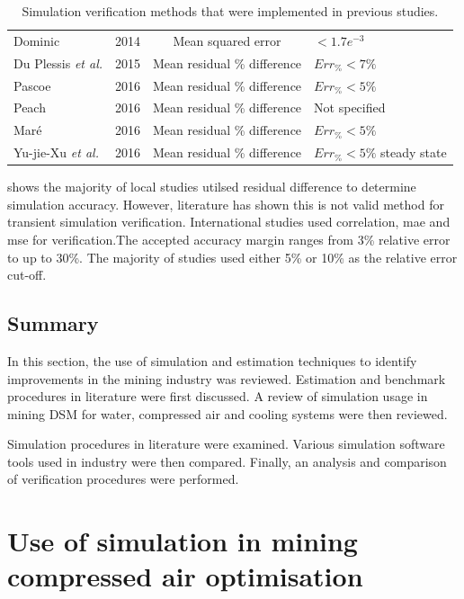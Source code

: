 \begin{table}[h]
\begin{tabular}{p{5cm}ccl}
 			Dominic \cite{dominic2014dynamic}					& 2014 & Mean squared error & $<1.7e^{-3}$	\\
 			Du Plessis \textit{et al.}\cite{du2015development} 	& 2015 & Mean residual \% difference & $Err_{\%} <7\%$ \\
 			Pascoe \cite{Pascoe2016Masters} 					& 2016 & Mean residual \% difference & $Err_{\%} <5\%$ \\	
			Peach \cite{Peach2016Masters}						& 2016 & Mean residual \% difference & Not specified\\
 			Maré \cite{Mare2016PhD} 							& 2016 & Mean residual \% difference & $Err_{\%} <5\%$  \\	
 			Yu-jie-Xu \textit{et al.} \cite{xu2016modeling}		& 2016 & Mean residual \% difference & $Err_{\%} <5\%$ steady state \\
 			\hline
 		\end{tabular} 
 		\caption{Simulation verification methods that were implemented in previous studies.}
 		\label{table: Verification studies}
 	\end{table}
 
  shows the majority of local studies utilsed residual difference to determine simulation accuracy. However, literature has shown this is not valid method for transient simulation verification. International studies used correlation, \gls{mae} and \gls{mse} for verification.The accepted accuracy margin ranges from 3\% relative error to  up to 30\%. The majority of studies used either 5\% or 10\%  as the relative error cut-off.
 	\subsection{Summary}
 	In this section, the use of simulation and estimation techniques to identify improvements in the mining industry was reviewed. Estimation and benchmark procedures in literature were first discussed. A review of simulation usage in mining DSM for water, compressed air and cooling systems were then reviewed.
 	
 	Simulation procedures in literature were examined. Various simulation software tools used in industry were then compared. Finally, an analysis and comparison of verification procedures were performed.
 	
\section{Use of simulation in mining compressed air optimisation}
\label{CompressorSimulation Literature}
